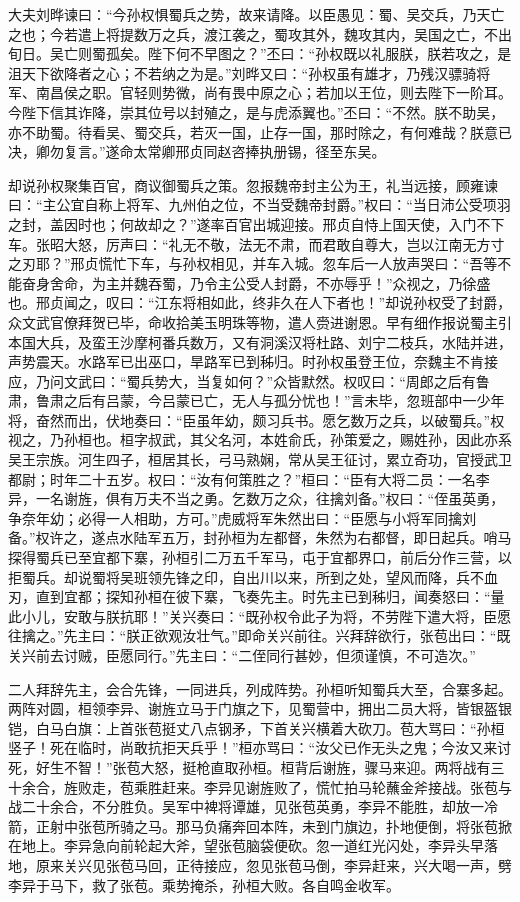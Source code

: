 大夫刘晔谏曰：“今孙权惧蜀兵之势，故来请降。以臣愚见：蜀、吴交兵，乃天亡之也；今若遣上将提数万之兵，渡江袭之，蜀攻其外，魏攻其内，吴国之亡，不出旬日。吴亡则蜀孤矣。陛下何不早图之？”丕曰：“孙权既以礼服朕，朕若攻之，是沮天下欲降者之心；不若纳之为是。”刘晔又曰：“孙权虽有雄才，乃残汉骠骑将军、南昌侯之职。官轻则势微，尚有畏中原之心；若加以王位，则去陛下一阶耳。今陛下信其诈降，崇其位号以封殖之，是与虎添翼也。”丕曰：“不然。朕不助吴，亦不助蜀。待看吴、蜀交兵，若灭一国，止存一国，那时除之，有何难哉？朕意已决，卿勿复言。”遂命太常卿邢贞同赵咨捧执册锡，径至东吴。

却说孙权聚集百官，商议御蜀兵之策。忽报魏帝封主公为王，礼当远接，顾雍谏曰：“主公宜自称上将军、九州伯之位，不当受魏帝封爵。”权曰：“当日沛公受项羽之封，盖因时也；何故却之？”遂率百官出城迎接。邢贞自恃上国天使，入门不下车。张昭大怒，厉声曰：“礼无不敬，法无不肃，而君敢自尊大，岂以江南无方寸之刃耶？”邢贞慌忙下车，与孙权相见，并车入城。忽车后一人放声哭曰：“吾等不能奋身舍命，为主并魏吞蜀，乃令主公受人封爵，不亦辱乎！”众视之，乃徐盛也。邢贞闻之，叹曰：“江东将相如此，终非久在人下者也！”却说孙权受了封爵，众文武官僚拜贺已毕，命收拾美玉明珠等物，遣人赍进谢恩。早有细作报说蜀主引本国大兵，及蛮王沙摩柯番兵数万，又有洞溪汉将杜路、刘宁二枝兵，水陆并进，声势震天。水路军已出巫口，旱路军已到秭归。时孙权虽登王位，奈魏主不肯接应，乃问文武曰：“蜀兵势大，当复如何？”众皆默然。权叹曰：“周郎之后有鲁肃，鲁肃之后有吕蒙，今吕蒙已亡，无人与孤分忧也！”言未毕，忽班部中一少年将，奋然而出，伏地奏曰：“臣虽年幼，颇习兵书。愿乞数万之兵，以破蜀兵。”权视之，乃孙桓也。桓字叔武，其父名河，本姓俞氏，孙策爱之，赐姓孙，因此亦系吴王宗族。河生四子，桓居其长，弓马熟娴，常从吴王征讨，累立奇功，官授武卫都尉；时年二十五岁。权曰：“汝有何策胜之？”桓曰：“臣有大将二员：一名李异，一名谢旌，俱有万夫不当之勇。乞数万之众，往擒刘备。”权曰：“侄虽英勇，争奈年幼；必得一人相助，方可。”虎威将军朱然出曰：“臣愿与小将军同擒刘备。”权许之，遂点水陆军五万，封孙桓为左都督，朱然为右都督，即日起兵。哨马探得蜀兵已至宜都下寨，孙桓引二万五千军马，屯于宜都界口，前后分作三营，以拒蜀兵。却说蜀将吴班领先锋之印，自出川以来，所到之处，望风而降，兵不血刃，直到宜都；探知孙桓在彼下寨，飞奏先主。时先主已到秭归，闻奏怒曰：“量此小儿，安敢与朕抗耶！”关兴奏曰：“既孙权令此子为将，不劳陛下遣大将，臣愿往擒之。”先主曰：“朕正欲观汝壮气。”即命关兴前往。兴拜辞欲行，张苞出曰：“既关兴前去讨贼，臣愿同行。”先主曰：“二侄同行甚妙，但须谨慎，不可造次。”

二人拜辞先主，会合先锋，一同进兵，列成阵势。孙桓听知蜀兵大至，合寨多起。两阵对圆，桓领李异、谢旌立马于门旗之下，见蜀营中，拥出二员大将，皆银盔银铠，白马白旗：上首张苞挺丈八点钢矛，下首关兴横着大砍刀。苞大骂曰：“孙桓竖子！死在临时，尚敢抗拒天兵乎！”桓亦骂曰：“汝父已作无头之鬼；今汝又来讨死，好生不智！”张苞大怒，挺枪直取孙桓。桓背后谢旌，骤马来迎。两将战有三十余合，旌败走，苞乘胜赶来。李异见谢旌败了，慌忙拍马轮蘸金斧接战。张苞与战二十余合，不分胜负。吴军中裨将谭雄，见张苞英勇，李异不能胜，却放一冷箭，正射中张苞所骑之马。那马负痛奔回本阵，未到门旗边，扑地便倒，将张苞掀在地上。李异急向前轮起大斧，望张苞脑袋便砍。忽一道红光闪处，李异头早落地，原来关兴见张苞马回，正待接应，忽见张苞马倒，李异赶来，兴大喝一声，劈李异于马下，救了张苞。乘势掩杀，孙桓大败。各自鸣金收军。

